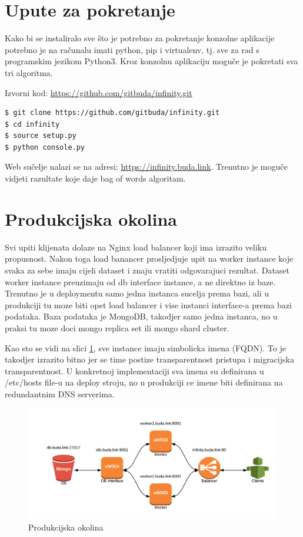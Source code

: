 \documentclass[a4paper,12pt]{article}
\begin{document}
\section{Upute za pokretanje}

Kako bi se instaliralo sve što je potrebno za pokretanje konzolne aplikacije potrebno je na računalu imati python, pip i virtualenv, tj. sve za rad s programskim jezikom Python3. Kroz konzolnu aplikaciju moguče je pokretati sva tri algoritma.

Izvorni kod: \url{https://github.com/gitbuda/infinity.git}

\begin{lstlisting}[language=bash]
$ git clone https://github.com/gitbuda/infinity.git
$ cd infinity
$ source setup.py
$ python console.py
\end{lstlisting}

Web sučelje nalazi se na adresi: \url{https://infinity.buda.link}. Trenutno je moguče vidjeti razultate koje daje bag of words algoritam.

\section{Produkcijska okolina}

Svi upiti klijenata dolaze na Nginx load balancer koji ima izrazito veliku propusnost. Nakon toga load banancer prosljedjuje upit na worker instance koje svaka za sebe imaju cijeli dataset i znaju vratiti odgovarajuci rezultat. Dataset worker instance preuzimaju od db interface instance, a ne direktno iz baze. Trenutno je u deploymentu samo jedna instanca sucelja prema bazi, ali u produkciji tu moze biti opet load balancer i vise instanci interface-a prema bazi podataka. Baza podataka je MongoDB, takodjer samo jedna instanca, no u praksi tu moze doci mongo replica set ili mongo shard cluster.

Kao sto se vidi na slici \ref{production_environment}, sve instance imaju simbolicka imena (FQDN). To je takodjer izrazito bitno jer se time postize transparentnost pristupa i migracijska transparentnost. U konkretnoj implementaciji sva imena su definirana u /etc/hosts file-u na deploy stroju, no u produkciji ce imene biti definirana na redundantnim DNS serverima.

\begin{figure}[!htbp]
\begin{center}
\includegraphics[width=\textwidth]{infinity.png}
\end{center}
\caption{Produkcijska okolina}\label{production_environment}
\end{figure}
\end{document}
